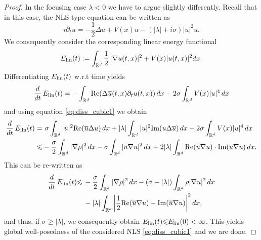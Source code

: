 \documentclass[a4paper,leqno]{amsart}
\theoremstyle{plain}
\theoremstyle{definition}
\numberwithin{equation}{section}
\begin{document}
\begin{proof}
In the focusing case $\lambda <0 $ we have to argue slightly differently. 
Recall that in this case, the NLS type equation can be written as
\begin{equation}\label{eq:diss_cubic1}
i{\partial}_t u =- {\frac{1}{2}}\Delta u +V(x) u -(|\lambda|+i\sigma)|u |^2 u .
\end{equation}
We consequently consider the corresponding linear energy functional 
\begin{equation*}\label{eq:diss_NLS_lin}
E_{\rm lin}(t):=\int_{{{\mathbb R}}^d}\frac{1}{2}\, |\nabla u(t,x)|^2+ V(x) |u(t,x)|^2d x.
\end{equation*}
Differentiating $E_{\rm lin}(t)$ w.r.t time yields
\begin{align*}
\frac{d}{d t} \, E_{\rm lin}(t)=-\int_{{{\mathbb R}}^d}{\mathrm{Re}}(\Delta{\overline{{u }}} (t,x) {\partial}_t u (t,x))\, d x - 2 \sigma \int_{{{\mathbb R}}^d} V(x) |u|^4 \, dx
\end{align*}
and using equation \eqref{eq:diss_cubic1} we obtain
\begin{align*}
\frac{d}{d t} \,  E_{\rm lin}(t)
= & \ \sigma\int_{{{\mathbb R}}^d}| u |^2{\mathrm{Re}}({\overline{{ u }}}\Delta u )\, d x  +|\lambda| \int_{{{\mathbb R}}^d}| u |^2{\mathrm{Im}}( u \Delta{\overline{{ u }}})\, d x - 2 \sigma \int_{{{\mathbb R}}^d} V(x) |u|^4 \, dx\\
{\leqslant} & -\frac{\sigma}{2}\int_{{{\mathbb R}}^d}|\nabla\rho|^2\, d x - \sigma\int_{{{\mathbb R}}^d}|{\overline{{u}}}\nabla u  |^2\, d x
+ 2|\lambda| \int_{{{\mathbb R}}^d}{\mathrm{Re}}({\overline{{u }}}\nabla u)\cdot{\mathrm{Im}}({\overline{{ u }}}\nabla u )\, d x.
\end{align*}
This can be re-written as
\begin{align*}
\frac{d}{d t} \,  E_{\rm lin}(t){\leqslant} & \, -\frac{\sigma}{2}\int_{{{\mathbb R}}^d}|\nabla\rho|^2\, d x -(\sigma-|\lambda| )\int_{{{\mathbb R}}^d}\rho|\nabla u |^2\, d x \\
& \, -|\lambda| \int_{{{\mathbb R}}^d}{\left|{\frac{1}{2}{\mathrm{Re}}({\overline{{u }}}\nabla u )- {\mathrm{Im}}({\overline{{u }}}\nabla  u )}\right|}^2\, d x,
\end{align*}
and thus, if $\sigma{\geqslant} |\lambda|$, we consequently obtain $E_{\rm lin}(t) {\leqslant} E_{\rm lin}(0) < \infty$. This 
yields global well-posedness of the considered NLS \eqref{eq:diss_cubic1} and we are done.
\end{proof}
\end{document}
